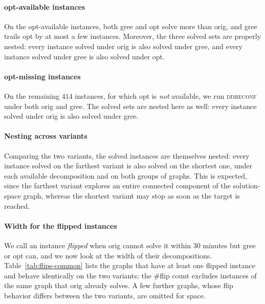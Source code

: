 \documentclass[conference]{IEEEtran}
\newcommand{\OrigDecom}{\textsf{orig}\xspace}
\newcommand{\HeurDecom}{\textsf{gree}\xspace}
\newcommand{\OptDecom}{\textsf{opt}\xspace}
\begin{document}
\paragraph{\OptDecom-available instances}
On the \OptDecom-available instances, both \HeurDecom and \OptDecom solve more than
\OrigDecom, and \HeurDecom trails \OptDecom by at most a few instances. Moreover,
the three solved sets are properly nested: every instance solved under \OrigDecom
is also solved under \HeurDecom, and every instance solved under \HeurDecom is also
solved under \OptDecom.

\paragraph{\OptDecom-missing instances}
On the remaining $414$ instances, for which \OptDecom is \emph{not} available, we
run \textsc{ddreconf} under both \OrigDecom and \HeurDecom. 
The solved sets are nested here as well: every instance solved under \OrigDecom is
also solved under \HeurDecom. 

\paragraph{Nesting across variants}
Comparing the two variants, the solved instances are themselves nested: every
instance solved on the farthest variant is also solved on the shortest one, under
each available decomposition and on both groups of graphs. This is expected,
since the farthest variant explores an entire connected component of the solution-space graph, whereas the shortest variant may stop as soon as the target is reached.

\paragraph{Width for the flipped instances}
We call an instance \emph{flipped} when \OrigDecom cannot solve it within $30$
minutes but \HeurDecom or \OptDecom can, and we now look at the width of their
decompositions. Table~\ref{tab:flips-common} lists the graphs that have at least one
flipped instance and behave identically on the two variants;
the \#flip count excludes instances of the same graph that \OrigDecom already
solves.
A few further graphs, whose flip behavior differs between the two variants, are
omitted for space. 
\end{document}
